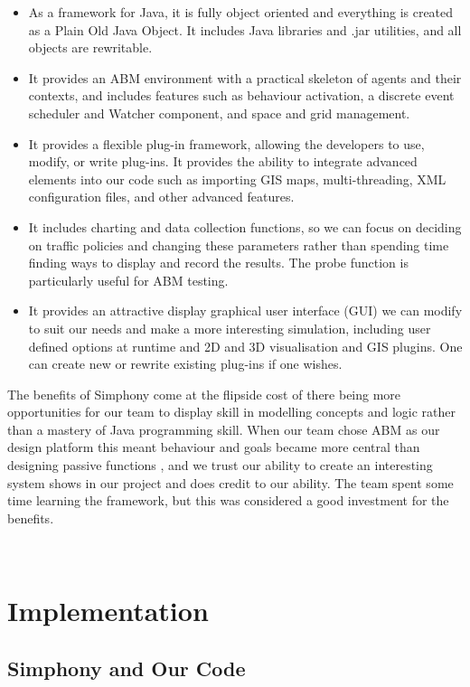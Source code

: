 \documentclass[11pt]{article}
\begin{document}
\begin{itemize}\itemsep0pt
\item As a framework for Java, it is fully object oriented and everything is created as a Plain Old Java Object. It includes Java libraries and .jar utilities, and all objects are rewritable.
\item It provides an ABM environment with a practical skeleton of agents and their contexts, and includes features such as behaviour activation, a discrete event scheduler and Watcher component, and space and grid management.
\item It provides a flexible plug-in framework, allowing the developers to use, modify, or write plug-ins. It provides the ability to integrate advanced elements into our code such as importing GIS maps, multi-threading, XML configuration files, and other advanced features.
\item It includes charting and data collection functions, so we can focus on deciding on traffic policies and changing these parameters rather than spending time finding ways to display and record the results. The probe function is particularly useful for ABM testing.
\item It provides an attractive display graphical user interface (GUI) we can modify to suit our needs and make a more interesting simulation, including user defined options at runtime and 2D and 3D visualisation and GIS plugins. One can create new or rewrite existing plug-ins if one wishes.
\end {itemize}

The benefits of Simphony come at the flipside cost of there being more opportunities for our team to display skill in modelling concepts and logic rather than a mastery of Java programming skill. When our team chose ABM as our design platform this meant behaviour and goals became more central than designing passive functions \cite{4d}, and we trust our ability to create an interesting system shows in our project and does credit to our ability. The team spent some time learning the framework, but this was considered a good investment for the benefits.

\\ 

\section{Implementation}

\subsection{Simphony and Our Code}
\end{document}

